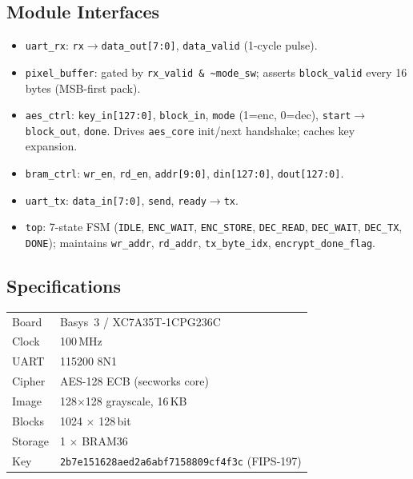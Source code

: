 \documentclass[11pt,a4paper]{article}
\begin{document}
\subsection{Module Interfaces}
\begin{itemize}\itemsep2pt
\item \texttt{uart\_rx}: \texttt{rx}$\to$\texttt{data\_out[7:0]},
      \texttt{data\_valid} (1-cycle pulse).
\item \texttt{pixel\_buffer}: gated by \texttt{rx\_valid \& \~{}mode\_sw};
      asserts \texttt{block\_valid} every 16 bytes (MSB-first pack).
\item \texttt{aes\_ctrl}: \texttt{key\_in[127:0]}, \texttt{block\_in},
      \texttt{mode} (1=enc, 0=dec), \texttt{start}$\to$
      \texttt{block\_out}, \texttt{done}. Drives \texttt{aes\_core}
      init/next handshake; caches key expansion.
\item \texttt{bram\_ctrl}: \texttt{wr\_en}, \texttt{rd\_en},
      \texttt{addr[9:0]}, \texttt{din[127:0]}, \texttt{dout[127:0]}.
\item \texttt{uart\_tx}: \texttt{data\_in[7:0]}, \texttt{send},
      \texttt{ready}$\to$\texttt{tx}.
\item \texttt{top}: 7-state FSM
      (\texttt{IDLE}, \texttt{ENC\_WAIT}, \texttt{ENC\_STORE},
      \texttt{DEC\_READ}, \texttt{DEC\_WAIT}, \texttt{DEC\_TX},
      \texttt{DONE}); maintains \texttt{wr\_addr}, \texttt{rd\_addr},
      \texttt{tx\_byte\_idx}, \texttt{encrypt\_done\_flag}.
\end{itemize}

\subsection{Specifications}
\begin{center}\small
\begin{tabular}{ll}\toprule
Board & Basys~3 / XC7A35T-1CPG236C \\
Clock & 100\,MHz \\
UART & 115200 8N1 \\
Cipher & AES-128 ECB (secworks core) \\
Image & 128$\times$128 grayscale, 16\,KB \\
Blocks & 1024 $\times$ 128\,bit \\
Storage & 1 $\times$ BRAM36 \\
Key & \texttt{2b7e151628aed2a6abf7158809cf4f3c} (FIPS-197) \\
\bottomrule
\end{tabular}
\end{center}
\end{document}
